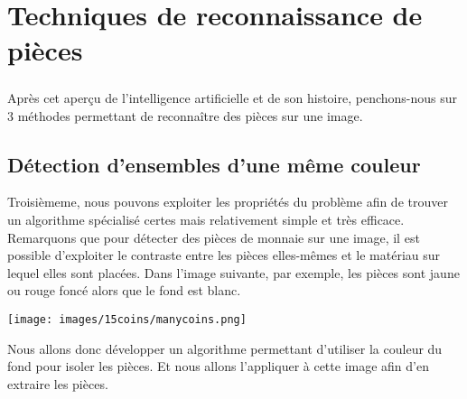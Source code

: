 \section{Techniques de reconnaissance de pièces}

\subparagraph*{}
Après cet aperçu de l'intelligence artificielle et de son histoire, penchons-nous sur $3$ méthodes permettant de reconnaître des pièces sur une image.





\subsection{Détection d'ensembles d'une même couleur} %
Troisièmeme, nous pouvons exploiter les propriétés du problème afin de trouver un algorithme spécialisé certes mais relativement simple et très efficace. Remarquons que pour détecter des pièces de monnaie sur une image, il est possible d'exploiter le contraste entre les pièces elles-mêmes et le matériau sur lequel elles sont placées. Dans l'image suivante, par exemple, les pièces sont jaune ou rouge foncé alors que le fond est blanc.

\begin{center}
\texttt{[image: images/15coins/manycoins.png]}
\end{center}

Nous allons donc développer un algorithme permettant d'utiliser la couleur du fond pour isoler les pièces. Et nous allons l'appliquer à cette image afin d'en extraire les pièces.